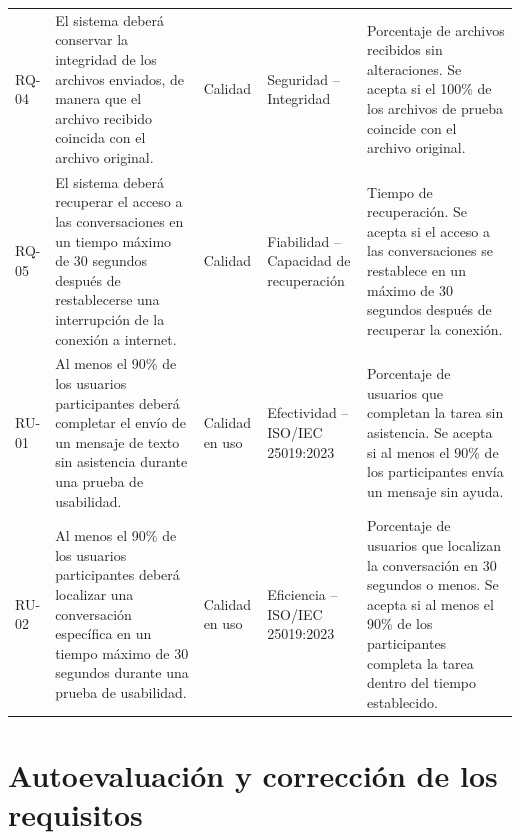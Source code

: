 \documentclass[12pt,a4paper,oneside]{article}
\begin{document}
\begin{longtable}{C{1.1cm} L{4.0cm} L{2.0cm} L{3.0cm} L{4.0cm}}
RQ-04 &
El sistema deberá conservar la integridad de los archivos enviados, de manera que el archivo recibido coincida con el archivo original. &
Calidad &
Seguridad -- Integridad &
Porcentaje de archivos recibidos sin alteraciones. Se acepta si el 100\% de los archivos de prueba coincide con el archivo original. \\

RQ-05 &
El sistema deberá recuperar el acceso a las conversaciones en un tiempo máximo de 30 segundos después de restablecerse una interrupción de la conexión a internet. &
Calidad &
Fiabilidad -- Capacidad de recuperación &
Tiempo de recuperación. Se acepta si el acceso a las conversaciones se restablece en un máximo de 30 segundos después de recuperar la conexión. \\

RU-01 &
Al menos el 90\% de los usuarios participantes deberá completar el envío de un mensaje de texto sin asistencia durante una prueba de usabilidad. &
Calidad en uso &
Efectividad -- ISO/IEC 25019:2023 &
Porcentaje de usuarios que completan la tarea sin asistencia. Se acepta si al menos el 90\% de los participantes envía un mensaje sin ayuda. \\

RU-02 &
Al menos el 90\% de los usuarios participantes deberá localizar una conversación específica en un tiempo máximo de 30 segundos durante una prueba de usabilidad. &
Calidad en uso &
Eficiencia -- ISO/IEC 25019:2023 &
Porcentaje de usuarios que localizan la conversación en 30 segundos o menos. Se acepta si al menos el 90\% de los participantes completa la tarea dentro del tiempo establecido. \\

\end{longtable}
\normalsize


\section{Autoevaluación y corrección de los requisitos}
\end{document}
